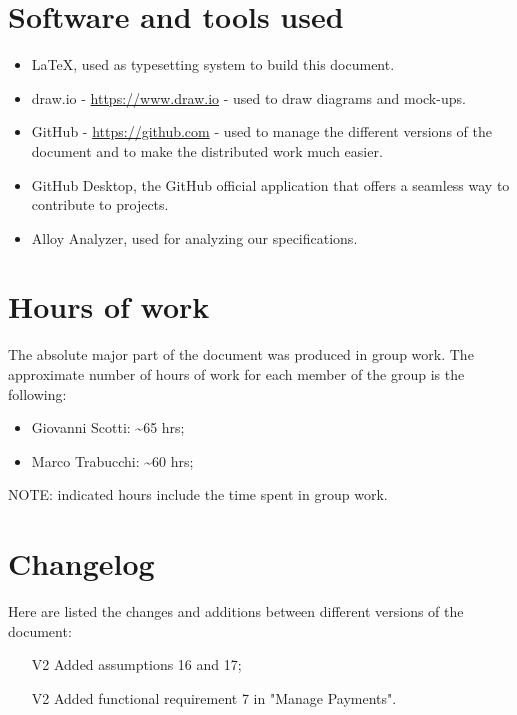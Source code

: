 \section{Software and tools used}
\begin{itemize}
\item \LaTeX, used as typesetting system to build this document.
\item draw.io - \url{https://www.draw.io} - used to draw diagrams and mock-ups.
\item GitHub - \url{https://github.com} - used to manage the different versions of the document and to make the distributed work much easier.
\item GitHub Desktop, the GitHub official application that offers a seamless way to contribute to projects.
\item Alloy Analyzer, used for analyzing our specifications.
\end{itemize}
\section{Hours of work}
The absolute major part of the document was produced in group work. The approximate number of hours of work for each member of the group is the following:

\begin{itemize}
\item Giovanni Scotti: \textasciitilde 65 hrs;
\item Marco Trabucchi: \textasciitilde 60 hrs;
\end{itemize}

NOTE: indicated hours include the time spent in group work.

\section{Changelog}
Here are listed the changes and additions between different versions of the document:
\begin{itemize}
\item[V2] Added assumptions 16 and 17;
\item[V2] Added functional requirement 7 in "Manage Payments".
\end{itemize}

